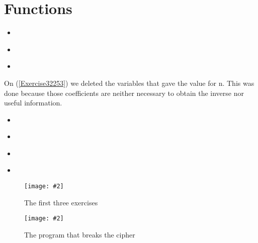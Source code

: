 \documentclass[titlepage, 12pt]{article}
\numberwithin{equation}{section}%
\numberwithin{figure}{section}%
\numberwithin{table}{section}%
\newcommand{\imagen}[4][]{
	\begin{figure}[H]
		\centering
		\texttt{[image: \#2]}
		\caption{#3}
		#4
	\end{figure}
}
\newcommand{\delimitCodeScript}[6][]{
	\begin{itemize}
		\item[]
	\end{itemize}	
}
\begin{document}
	\section{Functions}
		\delimitCodeScript{cpp}{Exercise1}{Implementation of the extended euclidean algorithm}{18}{33}
		\delimitCodeScript{c}{Exercise2}{Implementation of the given algorithm}{25}{54}
		\delimitCodeScript{c}{Exercise3}{Implementation of the given algorithm}{22}{53}
		On (\ref{Exercise32253}) we deleted the variables that gave the value for n. This was done because those coefficients are neither necessary to obtain the inverse nor useful information.
		\delimitCodeScript{cpp}{CipherCracking}{The steps necessary to obtain the key}{50}{59}
		\delimitCodeScript{cpp}{Functions}{The function to calculate the inverse of a matrix}{43}{65}
		\delimitCodeScript{cpp}{Functions}{The function to multiply two square matrices}{84}{100}
		\delimitCodeScript{cpp}{Functions}{The function that implements the Gauss-Jordan algorithm}{102}{132}
		\imagen[width=\linewidth]{Picture1}{The first three exercises}{\label{First3}}
		\imagen[width=\linewidth]{Picture2}{The program that breaks the cipher}{\label{Break}}
	
	
\end{document}
